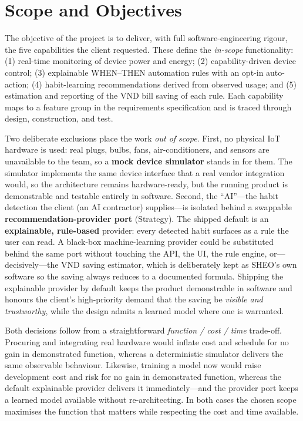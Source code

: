 \section{Scope and Objectives}

The objective of the project is to deliver, with full software-engineering rigour, the
five capabilities the client requested. These define the \emph{in-scope} functionality:
(1) real-time monitoring of device power and energy; (2) capability-driven device
control; (3) explainable WHEN--THEN automation rules with an opt-in auto-action;
(4) habit-learning recommendations derived from observed usage; and (5) estimation and
reporting of the VND bill saving of each rule. Each capability maps to a feature group
in the requirements specification and is traced through design, construction, and test.

Two deliberate exclusions place the work \emph{out of scope}. First, no physical IoT
hardware is used: real plugs, bulbs, fans, air-conditioners, and sensors are unavailable
to the team, so a \textbf{mock device simulator} stands in for them. The simulator
implements the same device interface that a real vendor integration would, so the
architecture remains hardware-ready, but the running product is demonstrable and
testable entirely in software. Second, the ``AI''---the habit detection the client (an
AI contractor) supplies---is isolated behind a swappable \textbf{recommendation-provider
port} (Strategy). The shipped default is an \textbf{explainable, rule-based} provider:
every detected habit surfaces as a rule the user can read. A black-box machine-learning
provider could be substituted behind the same port without touching the API, the UI, the
rule engine, or---decisively---the VND saving estimator, which is deliberately kept as
SHEO's own software so the saving always reduces to a documented formula. Shipping the
explainable provider by default keeps the product demonstrable in software and honours the
client's high-priority demand that the saving be \emph{visible and trustworthy}, while the
design admits a learned model where one is warranted.

Both decisions follow from a straightforward \emph{function / cost / time} trade-off.
Procuring and integrating real hardware would inflate cost and schedule for no gain in
demonstrated function, whereas a deterministic simulator delivers the same observable
behaviour. Likewise, training a model now would raise development cost and risk for no
gain in demonstrated function, whereas the default explainable provider delivers it
immediately---and the provider port keeps a learned model available without
re-architecting. In both cases the chosen scope maximises the function that matters while
respecting the cost and time available.

